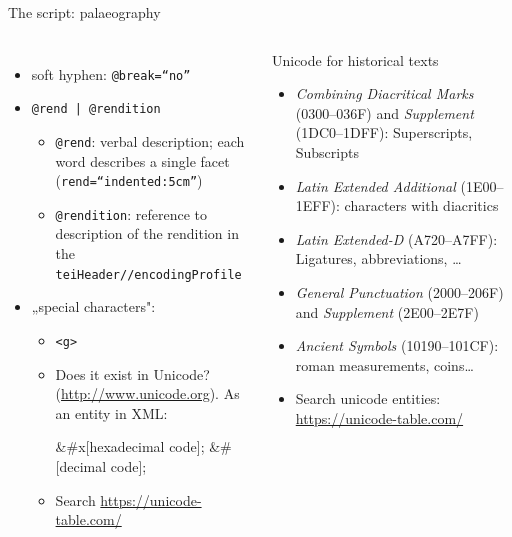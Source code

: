 \begin{frame}[fragile]{The script: palaeography}

\begin{columns}
\begin{itemize}
\item  soft hyphen: \texttt{@break=“no”}
\item  \texttt{@rend | @rendition}
\begin{itemize}
    \item \texttt{@rend}: verbal description; each word describes a single facet (\texttt{rend=“indented:5cm”})
    \item \texttt{@rendition}: reference to description of the rendition in the \texttt{teiHeader//encodingProfile}
\end{itemize}
\item  „special characters":
\begin{itemize}
    \item \texttt{<g>}
    \item Does it exist in Unicode? (\protect\url{http://www.unicode.org}). As an entity in XML:
\begin{xmlcode}
&#x[hexadecimal code];
&#[decimal code];
\end{xmlcode}
\item Search \protect\url{https://unicode-table.com/}
\end{itemize}
\end{itemize}

\begin{block}{Unicode for historical texts}\scriptsize
\begin{itemize}
\item  \emph{Combining Diacritical Marks} (0300–036F) and \emph{Supplement} (1DC0–1DFF): Superscripts, Subscripts
\item  \emph{Latin Extended Additional} (1E00–1EFF): characters with diacritics
\item  \emph{Latin Extended-D} (A720–A7FF): Ligatures, abbreviations, \dots
\item  \emph{General Punctuation} (2000–206F) and \emph{Supplement} (2E00–2E7F)%
\item  \emph{Ancient Symbols} (10190–101CF): roman measurements, coins\dots
\item Search unicode entities: \protect\url{https://unicode-table.com/}
\end{itemize}
\end{block}
\end{columns}


\end{frame}
